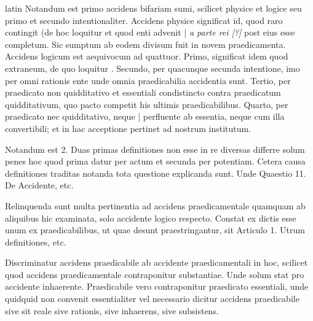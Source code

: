\begin{otherlanguage*}{latin}
\pstart
  Notandum est primo accidens bifariam sumi, scilicet physice et logice seu primo et secundo intentionaliter. Accidens physice significat id, quod raro contingit (de hoc loquitur  et quod enti advenit \textnormal{|} \emph{a parte rei [?]} post eius esse completum. Sic sumptum ab eodem  divisum fuit in novem praedicamenta. Accidens logicum est aequivocum ad quattuor. Primo, significat idem quod extraneum, de quo loquitur . Secundo, per quacunque secunda intentione, imo per omni rationis ente unde omnia praedicabilia accidentia sunt. Tertio, per praedicato non quidditativo et essentiali condistincto contra praedicatum quidditativum, quo pacto competit his ultimis praedicabilibus. Quarto, per praedicato nec quidditativo, neque \textnormal{|}   perfluente ab essentia, neque cum illa convertibili; et in hac acceptione pertinet ad nostrum institutum. 
\pend

\pstart
  Notandum est 2. Duas primas definitiones non esse in re diversas differre solum penes hoc quod prima datur per actum et secunda per potentiam. Cetera causa definitiones traditas notanda tota questione explicanda sunt. Unde Quaestio 11. De Accidente, etc. 
\pend

        \pstart
        \pend
      
\pstart
 Relinquenda sunt multa pertinentia ad accidens praedicamentale quamquam ab aliquibus hic examinata, solo accidente logico respecto. Constat ex dictis esse unum ex praedicabilibus, ut quae desunt praestringantur, sit Articulo 1. Utrum definitiones, etc. 
\pend

        \pstart
        \pend
      
\pstart
  Discriminatur accidens praedicabile ab accidente praedicamentali in hoc, scilicet quod accidens praedicamentale contraponitur substantiae. Unde solum stat pro accidente inhaerente. Praedicabile vero contraponitur praedicato essentiali, unde quidquid non convenit essentialiter vel necessario dicitur accidens praedicabile sive sit reale sive rationis, sive inhaerens, sive subsistens. 
\pend


\end{otherlanguage*}
